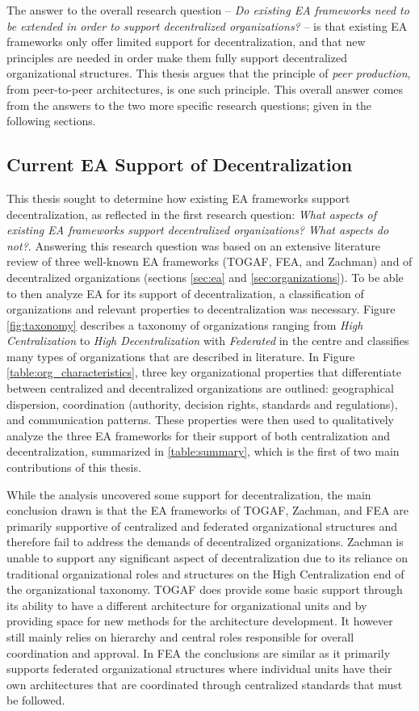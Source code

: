The answer to the overall research question -- \textit{Do existing EA frameworks need to be extended in order to support decentralized organizations?} -- is that existing EA frameworks only offer limited support for decentralization, and that new principles are needed in order make them fully support decentralized organizational structures. This thesis argues that the principle of \textit{peer production}, from peer-to-peer architectures, is one such principle. This overall answer comes from the answers to the two more specific research questions; given in the following sections.

\subsection{Current EA Support of Decentralization}

This thesis sought to determine how existing EA frameworks support decentralization, as reflected in the first research question: \textit{What aspects of existing EA frameworks support decentralized organizations? What aspects do not?}. Answering this research question was based on an extensive literature review of three well-known EA frameworks (TOGAF, FEA, and Zachman) and of decentralized organizations (sections \ref{sec:ea} and \ref{sec:organizations}). To be able to then analyze EA for its support of decentralization, a classification of organizations and relevant properties to decentralization was necessary. Figure \ref{fig:taxonomy} describes a taxonomy of organizations ranging from \textit{High Centralization} to \textit{High Decentralization} with \textit{Federated} in the centre and classifies many types of organizations that are described in literature. In Figure \ref{table:org_characteristics}, three key organizational properties that differentiate between centralized and decentralized organizations are outlined: geographical dispersion, coordination (authority, decision rights, standards and regulations), and communication patterns. These properties were then used to qualitatively analyze the three EA frameworks for their support of both centralization and decentralization, summarized in \ref{table:summary}, which is the first of two main contributions of this thesis.

While the analysis uncovered some support for decentralization, the main conclusion drawn is that the EA frameworks of TOGAF, Zachman, and FEA are primarily supportive of centralized and federated organizational structures and therefore fail to address the demands of decentralized organizations. Zachman is unable to support any significant aspect of decentralization due to its reliance on traditional organizational roles and structures on the High Centralization end of the organizational taxonomy. TOGAF does provide some basic support through its ability to have a different architecture for organizational units and by providing space for new methods for the architecture development. It however still mainly relies on hierarchy and central roles responsible for overall coordination and approval. In FEA the conclusions are similar as it primarily supports federated organizational structures where individual units have their own architectures that are coordinated through centralized standards that must be followed.

